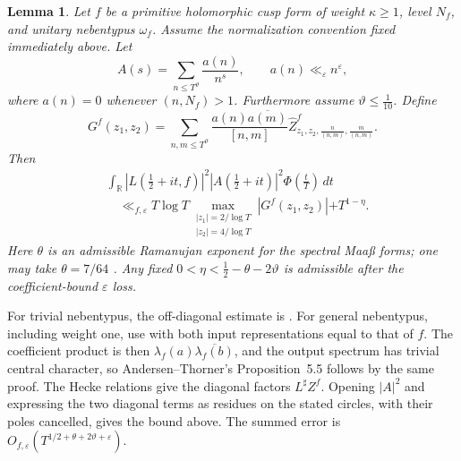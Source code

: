 \documentclass[oneside, 12pt]{amsart}
\newtheorem{lem}[thm]{Lemma}
\theoremstyle{definition}
\begin{document}
	\begin{lem}\label{twistedSecondMomentUpperBoundMultiplicativeHolomorphicCusp}
		Let $f$ be a primitive holomorphic cusp form of weight $\kappa\geq1$,
		level $N_f$, and unitary nebentypus $\omega_f$. Assume the normalization convention {fixed immediately above}. Let
		\[
		A(s)=\sum_{n\leq T^{\vartheta}}\frac{a(n)}{n^s},
		\qquad
		a(n)\ll_\varepsilon n^\varepsilon,
		\]
		where $a(n)=0$ whenever $(n,N_f)>1$. Furthermore assume $\vartheta \leq \frac{1}{10}$. Define
		\[
		G^f(z_1,z_2)
		=
		\sum_{{n,m\leq T^{\vartheta}}}
		\frac{{a(n)\overline{a(m)}}}{[n,m]}
		{\widehat Z^f_{z_1,z_2,
				\frac{n}{(n,m)},\frac{m}{(n,m)}}}.
		\]
		Then
		\begin{align*}
			&\int_{\mathbb R}
			\left|L\left(\tfrac12+it,f\right)\right|^2
			\left|A\left(\tfrac12+it\right)\right|^2
			\Phi\left(\frac tT\right)\,dt\\
			&\quad\ll_{f,\varepsilon}
			T\log T
			\max_{\substack{|z_1|=2/\log T\\|z_2|=4/\log T}}
			\left|G^f(z_1,z_2)\right|{+T^{1-\eta}}.
		\end{align*}
		{Here $\theta$ is an admissible Ramanujan exponent for the
			spectral Maa\ss{} forms; one may take $\theta=7/64$ \cite{KimSarnak}.
			Any fixed $0<\eta<\frac12-\theta-2\vartheta$ is admissible after
			the coefficient-bound $\varepsilon$ loss.}
	\end{lem}
	{For trivial nebentypus, the off-diagonal estimate is
		\cite[Proposition~3.4]{AndersenThorner}.  For general nebentypus,
		including weight one, use
		\cite[Theorem~2 and Remark~12, with the erratum]{BlomerHarcosErratum}
		with both input representations equal to that of $f$.
		The coefficient product is then
		$\lambda_f(a)\overline{\lambda_f(b)}$, and the output spectrum has
		trivial central character, so Andersen--Thorner's Proposition~5.5
		follows by the same proof.  The Hecke relations give the diagonal factors
		$L^\sharp Z^f$.  Opening $|A|^2$ and expressing the two diagonal
		terms as residues on the stated circles, with their poles cancelled,
		gives the bound above.  The summed error is
		$O_{f,\varepsilon}(T^{1/2+\theta+2\vartheta+\varepsilon})$.}
	
\end{document}
